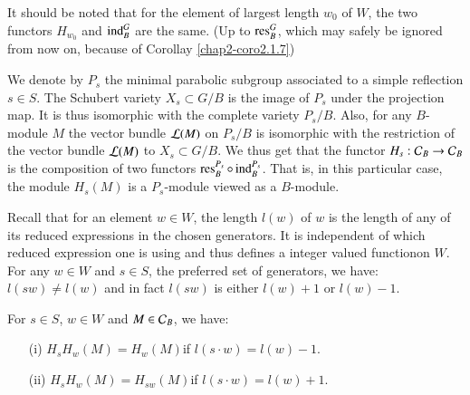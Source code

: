 \begin{remark}\label{chap2-rem2.2.3}
It should be noted that for the element of largest length $w_{0}$ of
$W$, the two functors $H_{w_{0}}$ and $\operatorname{ind}^{G}_{B}$ are the same. (Up
to $\operatorname{res}^{G}_{B}$, which may safely be ignored from now on, because of
Corollay \ref{chap2-coro2.1.7})
\end{remark}

\begin{remark}\label{chap2-rem2.2.4}
We denote by $P_{s}$ the minimal parabolic subgroup associated to a
simple reflection $s\in S$. The Schubert variety $X_{s}\subset G/B$ is
the image of $P_{s}$ under the projection map. It is thus isomorphic
with the complete variety $P_{s}/B$. Also, for any $B$-module $M$ the
vector bundle $\mathcal{L}(M)$ on $P_{s}/B$ is isomorphic with the restriction
of the vector bundle $\mathcal{L}(M)$ to $X_{s}\subset G/B$. We thus get that
the functor $H_{s}:\mathcal{C}_{B}\to \mathcal{C}_{B}$ is the composition of two
functors $\operatorname{res}^{P_{s}}_{B}\circ \operatorname{ind}^{P_{s}}_{B}$. That is, in this
particular case, the module $H_{s}(M)$ is a $P_{s}$-module viewed as a
$B$-module. 
\end{remark}

Recall that for an element $w\in W$, the length $l(w)$ of $w$ is the
length of any of its reduced expressions in the chosen generators. It
is independent of which reduced expression one is using and thus
defines a integer valued function\pageoriginale on $W$. For any $w\in
W$ and $s\in S$, the preferred set of generators, we have: $l(sw)\neq
l(w)$ and in fact $l(sw)$ is either $l(w)+1$ or $l(w)-1$.
\label{page14}
\begin{proposition}\label{chap2-prop2.2.5}
For $s\in S$, $w\in W$ and $M\in\mathcal{C}_{B}$, we have:
\begin{itemize}
\item[\rm(i)] $H_{s}H_{w}(M)=H_{w}(M)$\quad if $l(s\cdot w)=l(w)-1$.

\item[\rm(ii)] $H_{s}H_{w}(M)=H_{sw}(M)$\quad if $l(s\cdot
  w)=l(w)+1$. 
\end{itemize}
\end{proposition}

